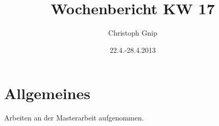 \documentclass[a4paper,12pt,fleqn]{scrartcl}
\title{Wochenbericht KW 17}
\author{Christoph Gnip}
\date{ 22.4.-28.4.2013 }
\begin{document}
\setlength{\headheight}{36pt}
\begin{titlepage}

\maketitle

\thispagestyle{empty}



\end{titlepage}
\section[Allgemeines]{Allgemeines}
Arbeiten an der Masterarbeit aufgenommen.
\end{document}
